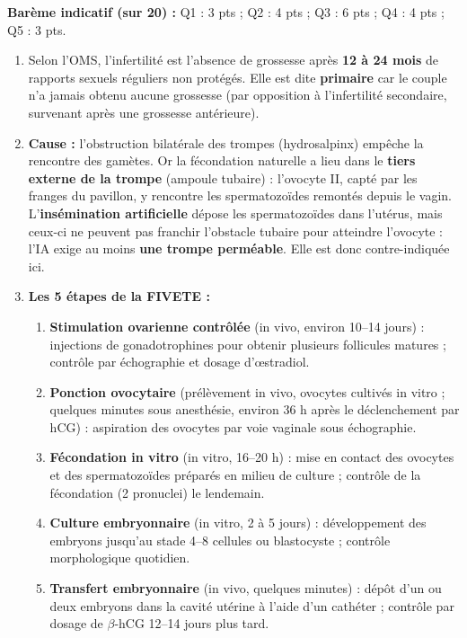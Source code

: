 \documentclass[11pt]{article}
\newcommand{\cle}[1]{{\popxbold\color{popdark}#1}}
\begin{document}
\begin{corrige}
\textbf{Barème indicatif (sur 20) :} Q1 : 3 pts ; Q2 : 4 pts ; Q3 : 6 pts ; Q4 : 4 pts ; Q5 : 3 pts.
\begin{enumerate}
    \item Selon l'OMS, l'\cle{infertilité} est l'absence de grossesse après \textbf{12 à 24 mois} de rapports sexuels réguliers non protégés. Elle est dite \textbf{primaire} car le couple n'a jamais obtenu aucune grossesse (par opposition à l'infertilité secondaire, survenant après une grossesse antérieure).
    \item \textbf{Cause :} l'obstruction bilatérale des trompes (hydrosalpinx) empêche la rencontre des gamètes. Or la fécondation naturelle a lieu dans le \textbf{tiers externe de la trompe} (ampoule tubaire) : l'ovocyte II, capté par les franges du pavillon, y rencontre les spermatozoïdes remontés depuis le vagin. L'\textbf{insémination artificielle} dépose les spermatozoïdes dans l'utérus, mais ceux-ci ne peuvent pas franchir l'obstacle tubaire pour atteindre l'ovocyte : l'IA exige au moins \textbf{une trompe perméable}. Elle est donc contre-indiquée ici.
    \item \textbf{Les 5 étapes de la FIVETE :}
    \begin{enumerate}
        \item \textbf{Stimulation ovarienne contrôlée} (in vivo, environ 10--14 jours) : injections de gonadotrophines pour obtenir plusieurs follicules matures ; contrôle par échographie et dosage d'œstradiol.
        \item \textbf{Ponction ovocytaire} (prélèvement in vivo, ovocytes cultivés in vitro ; quelques minutes sous anesthésie, environ 36 h après le déclenchement par hCG) : aspiration des ovocytes par voie vaginale sous échographie.
        \item \textbf{Fécondation in vitro} (in vitro, 16--20 h) : mise en contact des ovocytes et des spermatozoïdes préparés en milieu de culture ; contrôle de la fécondation (2 pronuclei) le lendemain.
        \item \textbf{Culture embryonnaire} (in vitro, 2 à 5 jours) : développement des embryons jusqu'au stade 4--8 cellules ou blastocyste ; contrôle morphologique quotidien.
        \item \textbf{Transfert embryonnaire} (in vivo, quelques minutes) : dépôt d'un ou deux embryons dans la cavité utérine à l'aide d'un cathéter ; contrôle par dosage de $\beta$-hCG 12--14 jours plus tard.

\end{enumerate}
\end{enumerate}
\end{corrige}
\end{document}
